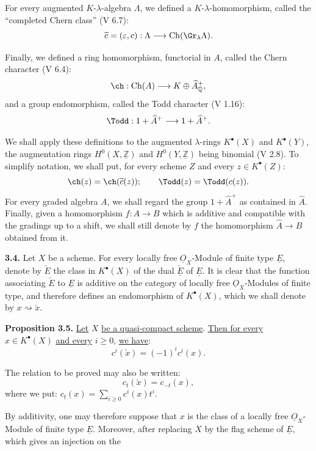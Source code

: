 For every augmented $K$-$\lambda$-algebra $\Lambda$, we defined a $K$-$\lambda$-homomorphism, called the ``completed Chern class'' (V 6.7):
\[
\widetilde c=(\varepsilon,c):\Lambda\longrightarrow\operatorname{Ch}(\Gr_{\lambda}\Lambda).
\]

Finally, we defined a ring homomorphism, functorial in $A$, called the Chern character (V 6.4):
\[
\ch:\operatorname{Ch}(A)\longrightarrow K\oplus\widehat A^+_{\mathbb Q},
\]
and a group endomorphism, called the Todd character (V 1.16):
\[
\Todd:1+\widehat A^+\longrightarrow1+\widehat A^+.
\]

%
We shall apply these definitions to the augmented $\lambda$-rings $K^{\bullet}(X)$ and $K^{\bullet}(Y)$, the augmentation rings $H^0(X,\underline{\mathbb Z})$ and $H^0(Y,\underline{\mathbb Z})$ being binomial (V 2.8). To simplify notation, we shall put, for every scheme $Z$ and every $z\in K^{\bullet}(Z)$:
\[
\ch(z)=\ch(\widetilde c(z));
\qquad
\Todd(z)=\Todd(c(z)).
\]
For every graded algebra $A$, we shall regard the group $1+\widehat A^+$ as contained in $\widehat A$. Finally, given a homomorphism $f:A\to B$ which is additive and compatible with the gradings up to a shift, we shall still denote by $f$ the homomorphism $\widehat A\to\widehat B$ obtained from it.

\textbf{3.4.} Let $X$ be a scheme. For every locally free $\underline{O}_X$-Module of finite type $\underline{E}$, denote by $\check E$ the class in $K^{\bullet}(X)$ of the dual $\underline{\check E}$ of $\underline{E}$. It is clear that the function associating $\check E$ to $\underline{E}$ is additive on the category of locally free $\underline{O}_X$-Modules of finite type, and therefore defines an endomorphism of $K^{\bullet}(X)$, which we shall denote by $x\rightsquigarrow\check x$.

\textbf{Proposition 3.5.} \uline{Let} $X$ \uline{be a quasi-compact scheme}. \uline{Then for every} $x\in K^{\bullet}(X)$ \uline{and every} $i\geq0$, \uline{we have}:
\[
c^i(\check x)=(-1)^i c^i(x).
\]

The relation to be proved may also be written:
\[
c_t(\check x)=c_{-t}(x),
\]
where we put: $c_t(x)=\sum_{i\geq0}c^i(x)t^i$.

By additivity, one may therefore suppose that $x$ is the class of a locally free $\underline{O}_X$-Module of finite type $\underline{E}$. Moreover, after replacing $X$ by the flag scheme of $\underline{E}$, which gives an injection on the

